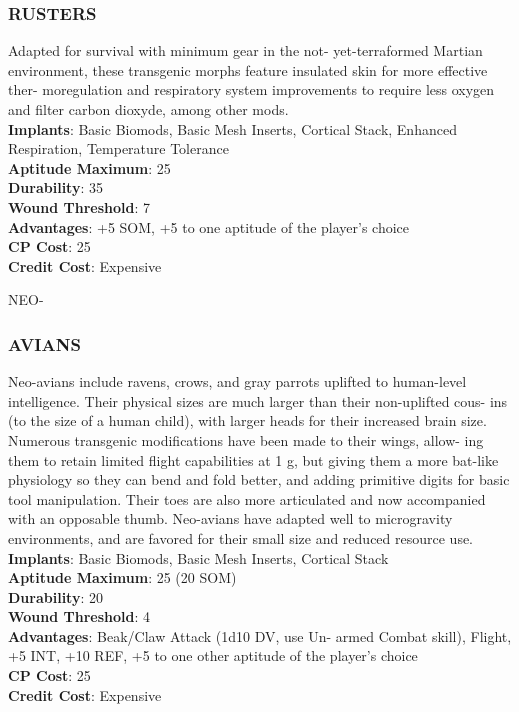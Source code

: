 \subsubsection{RUSTERS}
Adapted for survival with minimum gear in the not-
yet-terraformed Martian environment, these transgenic
morphs feature insulated skin for more effective ther-
moregulation and respiratory system improvements to
require less oxygen and filter carbon dioxyde, among
other mods.
\\ \textbf{Implants}: Basic Biomods, Basic Mesh Inserts, Cortical
Stack, Enhanced Respiration, Temperature Tolerance
\\ \textbf{Aptitude Maximum}: 25
\\ \textbf{Durability}: 35
\\ \textbf{Wound Threshold}: 7
\\ \textbf{Advantages}: +5 SOM, +5 to one aptitude of the
player’s choice
\\ \textbf{CP Cost}: 25
\\ \textbf{Credit Cost}: Expensive

NEO-\subsubsection{AVIANS}
Neo-avians include ravens, crows, and gray parrots
uplifted to human-level intelligence. Their physical
sizes are much larger than their non-uplifted cous-
ins (to the size of a human child), with larger heads
for their increased brain size. Numerous transgenic
modifications have been made to their wings, allow-
ing them to retain limited flight capabilities at 1 g,
but giving them a more bat-like physiology so they
can bend and fold better, and adding primitive digits
for basic tool manipulation. Their toes are also more
articulated and now accompanied with an opposable
thumb. Neo-avians have adapted well to microgravity
environments, and are favored for their small size and
reduced resource use.
\\ \textbf{Implants}: Basic Biomods, Basic Mesh Inserts,
Cortical Stack
\\ \textbf{Aptitude Maximum}: 25 (20 SOM)
\\ \textbf{Durability}: 20
\\ \textbf{Wound Threshold}: 4
\\ \textbf{Advantages}: Beak/Claw Attack (1d10 DV, use Un-
armed Combat skill), Flight, +5 INT, +10 REF, +5
to one other aptitude of the player’s choice
\\ \textbf{CP Cost}: 25
\\ \textbf{Credit Cost}: Expensive

